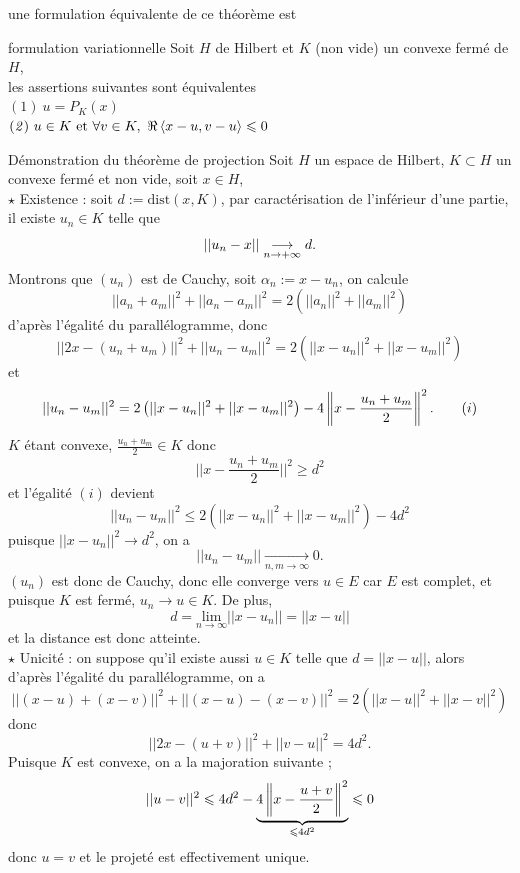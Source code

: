 \documentclass[a4paper,11pt, twoside]{article}
\begin{document}
une formulation équivalente de ce théorème est 


\begin{thC}{formulation variationnelle}
  Soit $H$ de Hilbert et $K$ (non vide) un convexe fermé de $H$,\\

  les assertions suivantes sont équivalentes\\
  $(\mathit 1)\ u=P_K(x)$\\
  $(\mathit 2)\ u\in K\text{ et }\forall v\in K,\ \Re\left\langle x-u,v-u \right\rangle\leqslant 0$
\end{thC}


\begin{ProofC}{Démonstration du théorème de projection}
  Soit $H$ un espace de Hilbert, $K\subset H$ un convexe fermé et non vide, soit $x\in H$,\\

  $\star$ Existence : soit $d:=\mathrm{dist}(x,K)$, par caractérisation de l'inférieur d'une partie, il existe $u_n\in K$ telle que 
  $$||u_n-x||\underset{n\to+\infty}{\longrightarrow} d.$$
  Montrons que $(u_n)$ est de Cauchy, soit $\alpha_n:=x-u_n$, on calcule
  $$||a_n+a_m||^2+||a_n-a_m||^2=2\left(||a_n||^2+||a_m||^2\right)$$
  d'après l'égalité du parallélogramme, donc 
  $$||2x-(u_n+u_m)||^2+||u_n-u_m||^2=2\left(||x-u_n||^2+||x-u_m||^2\right)$$
  et 
  $$||u_n-u_m||^2=2\left(||x-u_n||^2+||x-u_m||^2\right)-4\left\lVert x-\frac{u_n+u_m}{2}\right\rVert^2.\qquad (i)$$
  $K$ étant convexe, $\displaystyle\frac{u_n+u_m}{2}\in K$ donc 
  $$||x-\frac{u_n+u_m}{2}||^2\geqslant d^2$$
  et l'égalité $(i)$ devient 
  $$||u_n-u_m||^2\leqslant2\left(||x-u_n||^2+||x-u_m||^2\right)-4d^2$$
  puisque $||x-u_n||^2\longrightarrow d^2$, on a 
  $$||u_n-u_m||\underset{n,m\to\infty}{\longrightarrow}0.$$
  $(u_n)$ est donc de Cauchy, donc elle converge vers $u\in E$ car $E$ est complet, et puisque $K$ est fermé, $u_n\longrightarrow u\in K$. De plus, 
  $$d=\underset{n\to\infty}{\mathrm{lim}}||x-u_n||=||x-u||$$
  et la distance est donc atteinte.\\

  $\star$ Unicité : on suppose qu'il existe aussi $u\in K$ telle que $d=||x-u||$, alors d'après l'égalité du parallélogramme, on a 
  $$||(x-u)+(x-v)||^2+||(x-u)-(x-v)||^2=2\left(||x-u||^2+||x-v||^2\right)$$
  donc 
  $$||2x-(u+v)||^2+||v-u||^2=4d^2.$$
  Puisque $K$ est convexe, on a la majoration suivante ;
  $$||u-v||^2\leqslant 4d^2-\underbrace{4\left\lVert x-\frac{u+v}{2}\right\rVert^2}_{\leqslant 4d^2}\leqslant 0$$
  donc $u=v$ et le projeté est effectivement unique.
\end{ProofC}
\end{document}
